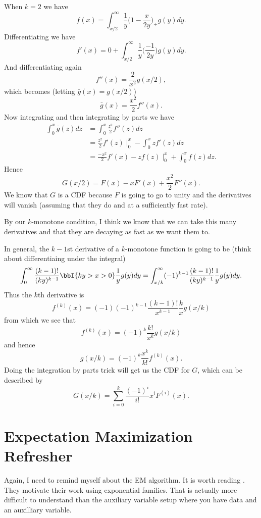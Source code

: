 \documentclass{article}
\begin{document}
When $k=2$ we have
\[
f(x) = \int_{x/2}^\infty \frac{1}{y} \Big(1 - \frac{x}{2y}\Big)_+ g(y) dy.
\]
Differentiating we have
\[
f'(x) = 0 + \int_{x/2}^\infty \frac{1}{y} \Big( \frac{-1}{2y} \Big) g(y) dy.
\]
And differentiating again
\[
f''(x) = \frac{2}{x^2} g(x/2),
\]
which becomes (letting $\bar g(x) = g(x/2)$)
\[
\bar g(x) = \frac{x^2}{2} f''(x).
\]
Now integrating and then integrating by parts we have
\begin{align*}
\int_0^x \bar g(z) dz & = \int_0^x \frac{z^2}{2} f''(z) dz \\
& = \frac{z^2}{2} f'(z) \mid_{0}^x - \int_0^x z f'(z) dz \\
& = \frac{-x^2}{2} f'(x) - z f(z) \mid_{0}^x + \int_0^x f(z) dz.
\end{align*}
Hence
\[
G(x/2) = F(x) - x F'(x) + \frac{x^2}{2} F''(x).
\]
We know that $G$ is a CDF because $F$ is going to go to unity and the
derivatives will vanish (assuming that they do and at a sufficiently fast rate).

By our $k$-monotone condition, I think we know that we can take this many
derivatives and that they are decaying as fast as we want them to.

In general, the $k-1$st derivative of a $k$-monotone function is going to be
(think about differentiaing under the integral)
\[
\int_0^\infty \frac{(k-1)!}{(ky)^{k-1}} \bbI\{ky > x > 0\} \frac{1}{y} g(y) dy
=
\int_{x/k}^\infty (-1)^{k-1} \frac{(k-1)!}{(ky)^{k-1}} \frac{1}{y} g(y) dy.
\]
Thus the $k$th derivative is
\[
f^{(k)}(x) = (-1) (-1)^{k-1} \frac{(k-1)!}{x^{k-1}} \frac{k}{x} g(x/k)
\]
from which we see that
\[
f^{(k)}(x) = (-1)^k \frac{k!}{x^k} g(x/k)
\]
and hence
\[
g(x/k) = (-1)^k \frac{x^k}{k!} f^{(k)}(x).
\]
Doing the integration by parts trick will get us the CDF for $G$, which can be
described by
\[
G(x/k) = \sum_{i=0}^k \frac{(-1)^i}{i!} x^i F^{(i)} (x).
\]

\section{Expectation Maximization Refresher}

Again, I need to remind myself about the EM algorithm.  It is worth reading
\cite{dempster-etal-1977}.  They motivate their work using exponential families.
That is actually more difficult to understand than the auxiliary variable setup
where you have data and an auxilliary variable.
\end{document}
